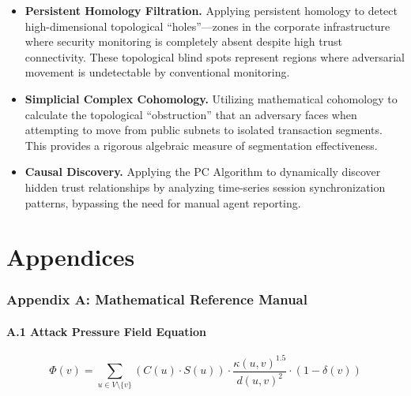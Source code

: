 \documentclass[11pt,a4paper]{article}
\theoremstyle{definition}
\numberwithin{equation}{section}
\begin{document}
\begin{itemize}[leftmargin=2em]
    \item \textbf{Persistent Homology Filtration.} Applying persistent homology to detect high-dimensional topological ``holes''---zones in the corporate infrastructure where security monitoring is completely absent despite high trust connectivity. These topological blind spots represent regions where adversarial movement is undetectable by conventional monitoring.

    \item \textbf{Simplicial Complex Cohomology.} Utilizing mathematical cohomology to calculate the topological ``obstruction'' that an adversary faces when attempting to move from public subnets to isolated transaction segments. This provides a rigorous algebraic measure of segmentation effectiveness.

    \item \textbf{Causal Discovery.} Applying the PC Algorithm to dynamically discover hidden trust relationships by analyzing time-series session synchronization patterns, bypassing the need for manual agent reporting.
\end{itemize}


\newpage
\part*{Appendices}

\section*{Appendix A: Mathematical Reference Manual}

\subsection*{A.1 Attack Pressure Field Equation}

\begin{equation}\label{eq:attack-pressure}
\Phi(v) = \sum_{u \in V \setminus \{v\}} \left( C(u) \cdot S(u) \right) \cdot \frac{\kappa(u,v)^{1.5}}{d(u,v)^2} \cdot (1 - \delta(v))
\end{equation}
\end{document}
